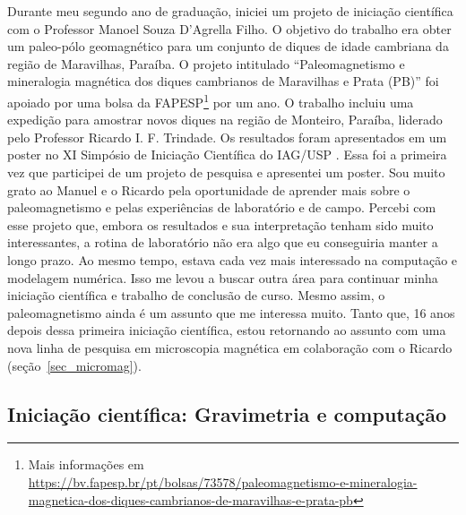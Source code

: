 \documentclass[10pt,a4paper,oneside]{book}
\begin{document}
Durante meu segundo ano de graduação, iniciei um projeto de iniciação
científica com o Professor Manoel Souza D'Agrella Filho.
O objetivo do trabalho era obter um paleo-pólo geomagnético para um conjunto
de diques de idade cambriana da região de Maravilhas, Paraíba.
O projeto intitulado ``Paleomagnetismo e mineralogia magnética dos diques
cambrianos de Maravilhas e Prata (PB)'' foi apoiado por uma bolsa da
FAPESP\footnote{Mais informações em
\url{https://bv.fapesp.br/pt/bolsas/73578/paleomagnetismo-e-mineralogia-magnetica-dos-diques-cambrianos-de-maravilhas-e-prata-pb}}
por um ano.
O trabalho incluiu uma expedição para amostrar novos diques na região de
Monteiro, Paraíba, liderado pelo Professor Ricardo I. F. Trindade.
Os resultados foram apresentados em um poster no XI Simpósio de Iniciação
Científica do IAG/USP \citep{Uieda2006}.
Essa foi a primeira vez que participei de um projeto de pesquisa e apresentei
um poster.
Sou muito grato ao Manuel e o Ricardo pela oportunidade de aprender mais sobre
o paleomagnetismo e pelas experiências de laboratório e de campo.
Percebi com esse projeto que, embora os resultados e sua interpretação tenham
sido muito interessantes, a rotina de laboratório não era algo que eu
conseguiria manter a longo prazo.
Ao mesmo tempo, estava cada vez mais interessado na computação e modelagem
numérica.
Isso me levou a buscar outra área para continuar minha iniciação científica e
trabalho de conclusão de curso.
Mesmo assim, o paleomagnetismo ainda é um assunto que me interessa muito.
Tanto que, 16 anos depois dessa primeira iniciação científica, estou retornando
ao assunto com uma nova linha de pesquisa em microscopia magnética em
colaboração com o Ricardo (seção~\ref{sec_micromag}).

\subsection{Iniciação científica: Gravimetria e computação}
\end{document}
